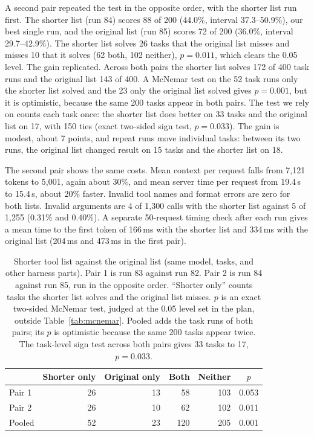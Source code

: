 \documentclass[11pt]{article}
\begin{document}
A second pair repeated the test in the opposite order, with the shorter list run first. The shorter list (run 84) scores 88 of 200 (44.0\%, interval 37.3--50.9\%), our best single run, and the original list (run 85) scores 72 of 200 (36.0\%, interval 29.7--42.9\%). The shorter list solves 26 tasks that the original list misses and misses 10 that it solves (62 both, 102 neither), $p=0.011$, which clears the 0.05 level. The gain replicated. Across both pairs the shorter list solves 172 of 400 task runs and the original list 143 of 400. A McNemar test on the 52 task runs only the shorter list solved and the 23 only the original list solved gives $p=0.001$, but it is optimistic, because the same 200 tasks appear in both pairs. The test we rely on counts each task once: the shorter list does better on 33 tasks and the original list on 17, with 150 ties (exact two-sided sign test, $p=0.033$). The gain is modest, about 7 points, and repeat runs move individual tasks: between its two runs, the original list changed result on 15 tasks and the shorter list on 18.

The second pair shows the same costs. Mean context per request falls from 7{,}121 tokens to 5{,}001, again about 30\%, and mean server time per request from 19.4\,s to 15.4\,s, about 20\% faster. Invalid tool names and format errors are zero for both lists. Invalid arguments are 4 of 1{,}300 calls with the shorter list against 5 of 1{,}255 (0.31\% and 0.40\%). A separate 50-request timing check after each run gives a mean time to the first token of 166\,ms with the shorter list and 334\,ms with the original list (204\,ms and 473\,ms in the first pair).

\begin{table}[!htbp]
\centering
\footnotesize
\caption{Shorter tool list against the original list (same model, tasks, and other harness parts). Pair 1 is run 83 against run 82. Pair 2 is run 84 against run 85, run in the opposite order. ``Shorter only'' counts tasks the shorter list solves and the original list misses. $p$ is an exact two-sided McNemar test, judged at the 0.05 level set in the plan, outside Table~\ref{tab:mcnemar}. Pooled adds the task runs of both pairs; its $p$ is optimistic because the same 200 tasks appear twice. The task-level sign test across both pairs gives 33 tasks to 17, $p=0.033$.}
\label{tab:trim}
\begin{tabular}{@{}lrrrrc@{}}
\toprule
 & Shorter only & Original only & Both & Neither & $p$ \\
\midrule
Pair 1 & 26 & 13 & 58 & 103 & 0.053 \\
Pair 2 & 26 & 10 & 62 & 102 & 0.011 \\
Pooled & 52 & 23 & 120 & 205 & 0.001 \\
\bottomrule
\end{tabular}
\end{table}
\end{document}
